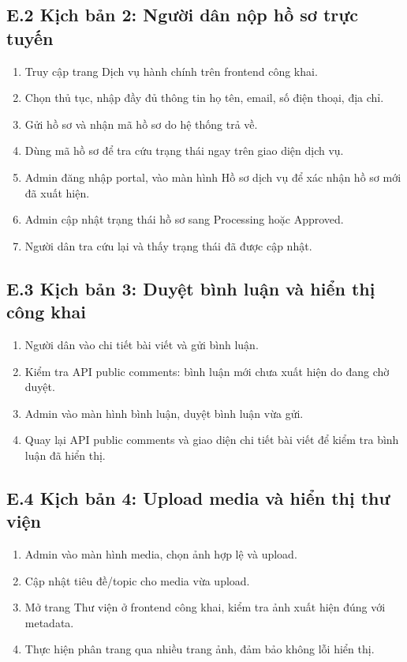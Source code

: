 \documentclass[12pt,a4paper]{article}
\begin{document}
\subsection*{E.2 Kịch bản 2: Người dân nộp hồ sơ trực tuyến}
\begin{enumerate}[leftmargin=1.1cm]
  \item Truy cập trang Dịch vụ hành chính trên frontend công khai.
  \item Chọn thủ tục, nhập đầy đủ thông tin họ tên, email, số điện thoại, địa chỉ.
  \item Gửi hồ sơ và nhận mã hồ sơ do hệ thống trả về.
  \item Dùng mã hồ sơ để tra cứu trạng thái ngay trên giao diện dịch vụ.
  \item Admin đăng nhập portal, vào màn hình Hồ sơ dịch vụ để xác nhận hồ sơ mới đã xuất hiện.
  \item Admin cập nhật trạng thái hồ sơ sang Processing hoặc Approved.
  \item Người dân tra cứu lại và thấy trạng thái đã được cập nhật.
\end{enumerate}

\subsection*{E.3 Kịch bản 3: Duyệt bình luận và hiển thị công khai}
\begin{enumerate}[leftmargin=1.1cm]
  \item Người dân vào chi tiết bài viết và gửi bình luận.
  \item Kiểm tra API public comments: bình luận mới chưa xuất hiện do đang chờ duyệt.
  \item Admin vào màn hình bình luận, duyệt bình luận vừa gửi.
  \item Quay lại API public comments và giao diện chi tiết bài viết để kiểm tra bình luận đã hiển thị.
\end{enumerate}

\subsection*{E.4 Kịch bản 4: Upload media và hiển thị thư viện}
\begin{enumerate}[leftmargin=1.1cm]
  \item Admin vào màn hình media, chọn ảnh hợp lệ và upload.
  \item Cập nhật tiêu đề/topic cho media vừa upload.
  \item Mở trang Thư viện ở frontend công khai, kiểm tra ảnh xuất hiện đúng với metadata.
  \item Thực hiện phân trang qua nhiều trang ảnh, đảm bảo không lỗi hiển thị.
\end{enumerate}
\end{document}
